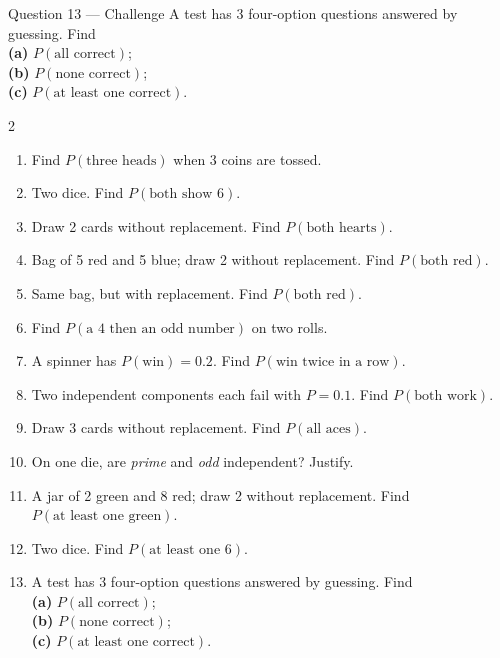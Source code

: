 \documentclass[11pt]{article}
\begin{document}
\begin{qbox}{Question 13 --- Challenge}
A test has 3 four-option questions answered by guessing. Find \\ \textbf{(a)} $P(\text{all correct})$; \\ \textbf{(b)} $P(\text{none correct})$; \\ \textbf{(c)} $P(\text{at least one correct})$.\workspace{3cm}
\end{qbox}

\clearpage
{}

\begin{recapbox}
\begin{multicols}{2}
\small
\begin{enumerate}[leftmargin=*,itemsep=3pt]
  \item Find $P(\text{three heads})$ when 3 coins are tossed.
  \item Two dice. Find $P(\text{both show 6})$.
  \item Draw 2 cards without replacement. Find $P(\text{both hearts})$.
  \item Bag of 5 red and 5 blue; draw 2 without replacement. Find $P(\text{both red})$.
  \item Same bag, but with replacement. Find $P(\text{both red})$.
  \item Find $P(\text{a 4 then an odd number})$ on two rolls.
  \item A spinner has $P(\text{win})=0.2$. Find $P(\text{win twice in a row})$.
  \item Two independent components each fail with $P=0.1$. Find $P(\text{both work})$.
  \item Draw 3 cards without replacement. Find $P(\text{all aces})$.
  \item On one die, are \emph{prime} and \emph{odd} independent? Justify.
  \item A jar of 2 green and 8 red; draw 2 without replacement. Find $P(\text{at least one green})$.
  \item Two dice. Find $P(\text{at least one 6})$.
  \item A test has 3 four-option questions answered by guessing. Find \\ \textbf{(a)} $P(\text{all correct})$; \\ \textbf{(b)} $P(\text{none correct})$; \\ \textbf{(c)} $P(\text{at least one correct})$.
\end{enumerate}
\end{multicols}
\end{recapbox}
\end{document}
